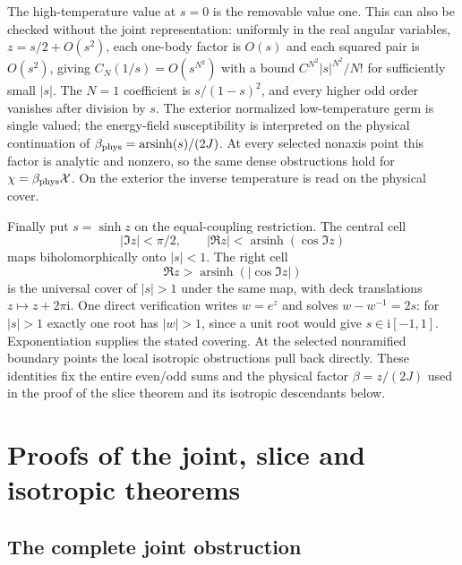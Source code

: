 \documentclass[11pt]{article}
\numberwithin{equation}{section}
\theoremstyle{definition}
\newcommand{\ii}{\mathrm i}
\begin{document}
The high-temperature value at $s=0$ is the removable value one.
This can also be checked
without the joint representation: uniformly in the real angular
variables, $z=s/2+O(s^2)$, each one-body factor is $O(s)$ and each
squared pair is $O(s^2)$, giving $C_N(1/s)=O(s^{N^2})$ with a
bound $C^{N^2}|s|^{N^2}/N!$ for sufficiently small $|s|$.
The $N=1$ coefficient is $s/(1-s)^2$, and every higher odd order
vanishes after division by $s$. The exterior normalized
low-temperature germ is single valued; the energy-field susceptibility
is interpreted on the physical continuation of
$\beta_{\rm phys}=\operatorname{arsinh}(s)/(2J)$.
At every selected nonaxis point this factor is analytic and nonzero,
so the same dense obstructions hold for $\chi=\beta_{\rm phys}\mathcal X$.
On the exterior the inverse temperature is read on the physical cover.

Finally put $s=\sinh z$ on the equal-coupling restriction.
The central cell
\[
 |\Im z|<\pi/2,\qquad
 |\Re z|<\operatorname{arsinh}(\cos\Im z)
\]
maps biholomorphically onto $|s|<1$. The right cell
\[
 \Re z>\operatorname{arsinh}(|\cos\Im z|)
\]
is the universal cover of $|s|>1$ under the same map, with deck
translations $z\mapsto z+2\pi\ii$.
One direct verification writes $w=e^z$ and solves $w-w^{-1}=2s$:
for $|s|>1$ exactly one root has $|w|>1$, since a unit root would give
$s\in\ii[-1,1]$. Exponentiation supplies the stated covering.
At the selected nonramified boundary points the local isotropic
obstructions pull back directly. These identities fix the entire
even/odd sums and the physical factor $\beta=z/(2J)$ used in the
proof of the slice theorem and its isotropic descendants below.

\section{Proofs of the joint, slice and isotropic theorems}
\label{main:closure}

\subsection{The complete joint obstruction}
\end{document}

